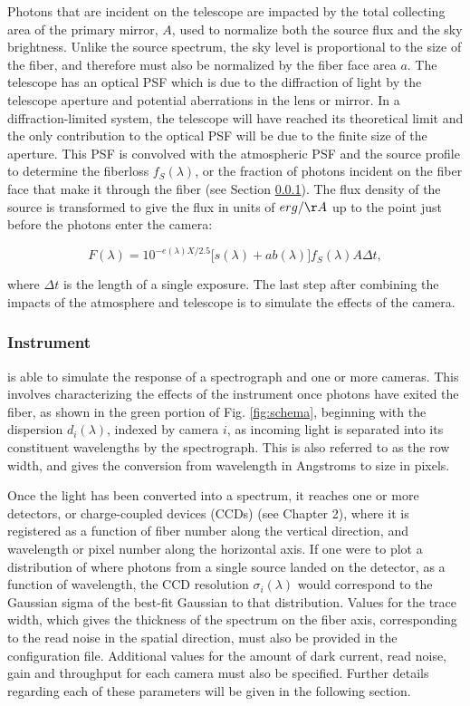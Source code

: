 Photons that are incident on the telescope are impacted by the total collecting area of the primary mirror, $A$, used to normalize both the source flux and the sky brightness. Unlike the source spectrum, the sky level is proportional to the size of the fiber, and therefore must also be normalized by the fiber face area $a$. The telescope has an optical PSF which is due to the diffraction of light by the telescope aperture and potential aberrations in the lens or mirror. In a diffraction-limited system, the telescope will have reached its theoretical limit and the only contribution to the optical PSF will be due to the finite size of the aperture. This PSF is convolved with the atmospheric PSF and the source profile to determine the fiberloss $f_{S}(\lambda)$, or the fraction of photons incident on the fiber face that make it through the fiber (see Section \ref{sec:instrument}). The flux density of the source is transformed to give the flux in units of $erg / \AA$ up to the point just before the photons enter the camera: 

\begin{equation}
    F(\lambda) = 10^{-e(\lambda)X/2.5}\Big[s(\lambda) + ab(\lambda)\Big]f_{S}(\lambda)A\Delta t,
\label{eq:flux}
\end{equation}

where $\Delta t$ is the length of a single exposure. The last step after combining the impacts of the atmosphere and telescope is to simulate the effects of the camera.

\subsubsection{Instrument}
\label{sec:instrument}
 is able to simulate the response of a spectrograph and one or more cameras. This involves characterizing the effects of the instrument once photons have exited the fiber, as shown in the green portion of Fig. \ref{fig:schema}, beginning with the dispersion $d_{i}(\lambda)$, indexed by camera $i$, as incoming light is separated into its constituent wavelengths by the spectrograph. This is also referred to as the row width, and gives the conversion from wavelength in Angstroms to size in pixels.

Once the light has been converted into a spectrum, it reaches one or more detectors, or charge-coupled devices (CCDs) (see Chapter 2), where it is registered as a function of fiber number along the vertical direction, and wavelength or pixel number along the horizontal axis. If one were to plot a distribution of where photons from a single source landed on the detector, as a function of wavelength, the CCD resolution $\sigma_{i}(\lambda)$ would correspond to the Gaussian sigma of the best-fit Gaussian to that distribution. Values for the trace width, which gives the thickness of the spectrum on the fiber axis, corresponding to the read noise in the spatial direction, must also be provided in the configuration file. Additional values for the amount of dark current, read noise, gain and throughput for each camera must also be specified. Further details regarding each of these parameters will be given in the following section.

